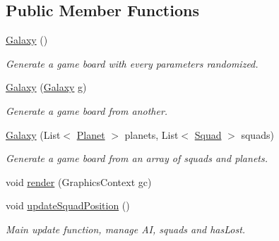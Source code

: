\subsection*{Public Member Functions}
\begin{DoxyCompactItemize}
\item 
\mbox{\label{classfr_1_1groupe40_1_1projet_1_1model_1_1board_1_1_galaxy_acd002a00e4679b804002c05afb3b8308}} 
\hyperlink{classfr_1_1groupe40_1_1projet_1_1model_1_1board_1_1_galaxy_acd002a00e4679b804002c05afb3b8308}{Galaxy} ()
\begin{DoxyCompactList}\small\item\em Generate a game board with every parameters randomized. \end{DoxyCompactList}\item 
\hyperlink{classfr_1_1groupe40_1_1projet_1_1model_1_1board_1_1_galaxy_ae10e23d6a41a5b878123a8b03ec31e5a}{Galaxy} (\hyperlink{classfr_1_1groupe40_1_1projet_1_1model_1_1board_1_1_galaxy}{Galaxy} g)
\begin{DoxyCompactList}\small\item\em Generate a game board from another. \end{DoxyCompactList}\item 
\hyperlink{classfr_1_1groupe40_1_1projet_1_1model_1_1board_1_1_galaxy_ab214654e58ccf7bc40216d177cde0479}{Galaxy} (List$<$ \hyperlink{classfr_1_1groupe40_1_1projet_1_1model_1_1planets_1_1_planet}{Planet} $>$ planets, List$<$ \hyperlink{classfr_1_1groupe40_1_1projet_1_1model_1_1ships_1_1_squad}{Squad} $>$ squads)
\begin{DoxyCompactList}\small\item\em Generate a game board from an array of squads and planets. \end{DoxyCompactList}\item 
void \hyperlink{classfr_1_1groupe40_1_1projet_1_1model_1_1board_1_1_galaxy_ab3b17b740db263c25b80f7b9e6f33d24}{render} (Graphics\+Context gc)
\item 
\mbox{\label{classfr_1_1groupe40_1_1projet_1_1model_1_1board_1_1_galaxy_a60fca62070a6cc902778ec3409a39c83}} 
void \hyperlink{classfr_1_1groupe40_1_1projet_1_1model_1_1board_1_1_galaxy_a60fca62070a6cc902778ec3409a39c83}{update\+Squad\+Position} ()
\begin{DoxyCompactList}\small\item\em Main update function, manage AI, squads and has\+Lost. \end{DoxyCompactList}\item 

\end{DoxyCompactItemize}
